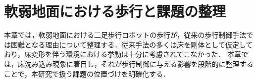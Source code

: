 \chapter{軟弱地面における歩行と課題の整理}

本章では，軟弱地面における二足歩行ロボットの歩行が，従来の歩行制御手法では困難となる理由について整理する．従来手法の多くは床を剛体として仮定しており，床変形を伴う環境における挙動は十分に考慮されてこなかった．
本章では，床沈み込み現象に着目し，それが歩行制御に与える影響を段階的に整理することで，本研究で扱う課題の位置づけを明確化する．
\label{chap:
assignment}
%

%

%

%

%
% 
